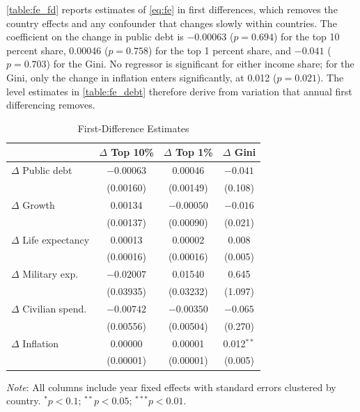 \documentclass[12pt, titlepage]{article}
\numberwithin{equation}{section}
\begin{document}
\autoref{table:fe_fd} reports estimates of \eqref{eq:fe} in first differences,
which removes the country effects and any confounder that changes slowly within
countries. The coefficient on the change in public debt is $-0.00063$
($p = 0.694$) for the top 10 percent share, 0.00046 ($p = 0.758$) for the top
1 percent share, and $-0.041$ ($p = 0.703$) for the Gini. No regressor is
significant for either income share; for the Gini, only the change in
inflation enters significantly, at 0.012 ($p = 0.021$). The level estimates in
\autoref{table:fe_debt} therefore derive from variation that annual first
differencing removes.

\begin{table}[htbp]
	\centering
	\begin{threeparttable}
		\caption{First-Difference Estimates}
		\label{table:fe_fd}
		\begin{small}
			\begin{tabular}{lccc}
				\toprule
				& $\Delta$ Top 10\% & $\Delta$ Top 1\% & $\Delta$ Gini \\
				\midrule
				$\Delta$ Public debt      & $-0.00063$\phantom{$^{**}$} & \phantom{$-$}0.00046\phantom{$^{**}$} & $-0.041$\phantom{$^{**}$} \\
				& (0.00160) & (0.00149) & (0.108) \\
				\addlinespace
				$\Delta$ Growth           & \phantom{$-$}0.00134\phantom{$^{**}$} & $-0.00050$\phantom{$^{**}$} & $-0.016$\phantom{$^{**}$} \\
				& (0.00137) & (0.00090) & (0.021) \\
				\addlinespace
				$\Delta$ Life expectancy  & \phantom{$-$}0.00013\phantom{$^{**}$} & \phantom{$-$}0.00002\phantom{$^{**}$} & \phantom{$-$}0.008\phantom{$^{**}$} \\
				& (0.00016) & (0.00016) & (0.005) \\
				\addlinespace
				$\Delta$ Military exp.    & $-0.02007$\phantom{$^{**}$} & \phantom{$-$}0.01540\phantom{$^{**}$} & \phantom{$-$}0.645\phantom{$^{**}$} \\
				& (0.03935) & (0.03232) & (1.097) \\
				\addlinespace
				$\Delta$ Civilian spend.  & $-0.00742$\phantom{$^{**}$} & $-0.00350$\phantom{$^{**}$} & $-0.065$\phantom{$^{**}$} \\
				& (0.00556) & (0.00504) & (0.270) \\
				\addlinespace
				$\Delta$ Inflation        & \phantom{$-$}0.00000\phantom{$^{**}$} & \phantom{$-$}0.00001\phantom{$^{**}$} & \phantom{$-$}0.012$^{**}$ \\
				& (0.00001) & (0.00001) & (0.005) \\
				\bottomrule
			\end{tabular}
		\end{small}
		\begin{tablenotes}
			\footnotesize
			\item \emph{Note}: All columns include year fixed effects with standard
			errors clustered by country. $^{*}p<0.1$; $^{**}p<0.05$; $^{***}p<0.01$.
		\end{tablenotes}
	\end{threeparttable}
\end{table}
\end{document}
